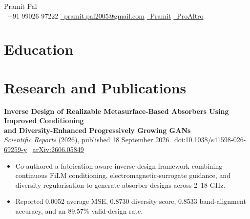 \documentclass[a4paper, 11pt]{article}
\makeatletter
\newcommand{\name}{Pramit Pal}
\newcommand{\phone}{+91 99026 97222}
\newcommand{\emailPersonal}{pramit.pal2005@gmail.com}
\newcommand{\GitHub}{https://github.com/ProAltro}
\makeatother
\begin{document}
\pagestyle{cvpages}

\begin{center}
    {\huge \name}\\
    \vspace{5pt}
    \small \raisebox{0.0\height}{\small \faPhone}\ {\phone}
    \hspace{2mm}
    \href{mailto:\emailPersonal}{\raisebox{0.0\height}{\small \faEnvelope}\ {\emailPersonal}}
    \hspace{2mm}
    \href{https://www.linkedin.com/in/pramit-p-8404a4264/}{\raisebox{0.0\height}{\footnotesize \faLinkedin}\ {Pramit}}
    \hspace{2mm} \href{\GitHub}{\raisebox{0.0\height}{\footnotesize \faGithub}\ {ProAltro}}
\end{center}

\section{Education}
\resumeSubHeadingListStart
{}
\resumeSubHeadingListEnd

\section{Research and Publications}
\resumeSubHeadingListStart
\item {\small\raggedright
    \textbf{Inverse Design of Realizable Metasurface-Based Absorbers Using Improved Conditioning\\
    and Diversity-Enhanced Progressively Growing GANs}\\
    \textit{Scientific Reports} (2026), published 18 September 2026.\
    \href{https://doi.org/10.1038/s41598-026-69259-y}{doi:10.1038/s41598-026-69259-y} \textbar\ \href{https://arxiv.org/abs/2606.05849}{arXiv:2606.05849}
    \begin{itemize}
        \item Co-authored a fabrication-aware inverse-design framework combining continuous FiLM conditioning, electromagnetic-surrogate guidance, and diversity regularisation to generate absorber designs across 2--18 GHz.
        \item Reported 0.0052 average MSE, 0.8730 diversity score, 0.8533 band-alignment accuracy, and an 89.57\% valid-design rate.
    \end{itemize}
}
\resumeSubHeadingListEnd
\end{document}
